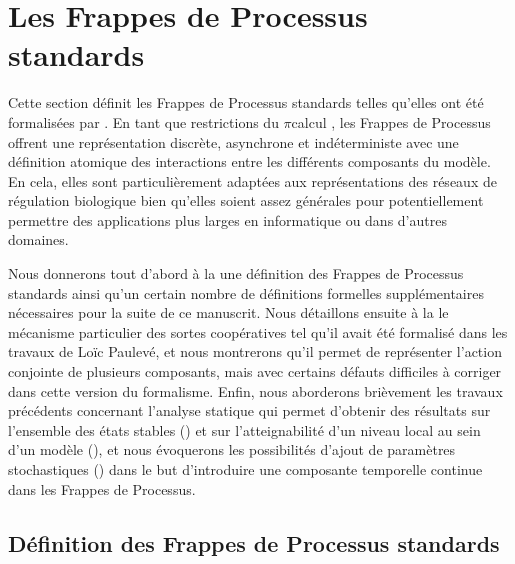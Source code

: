 \section{Les Frappes de Processus standards}

Cette section définit les Frappes de Processus standards
telles qu'elles ont été formalisées par .
En tant que restrictions du $\pi$\nbd calcul \cite{Brand83,Milner89},
les Frappes de Processus offrent une représentation discrète, asynchrone et indéterministe
avec une définition atomique des interactions entre les différents composants du modèle.
En cela,
elles sont particulièrement adaptées aux représentations des réseaux de régulation biologique
bien qu'elles soient assez générales pour potentiellement permettre des applications plus
larges en informatique ou dans d'autres domaines.

Nous donnerons tout d'abord à la  une définition des Frappes de Processus standards
ainsi qu'un certain nombre de définitions formelles supplémentaires
nécessaires pour la suite de ce manuscrit.
Nous détaillons ensuite à la  le mécanisme particulier des sortes coopératives
tel qu'il avait été formalisé dans les travaux de Loïc Paulevé,
et nous montrerons qu'il permet de représenter l'action conjointe de plusieurs composants,
mais avec certains défauts difficiles à corriger dans cette version du formalisme.
Enfin, nous aborderons brièvement les travaux précédents
concernant l'analyse statique qui permet d'obtenir des résultats
sur l'ensemble des états stables ()
et sur l'atteignabilité d'un niveau local au sein d'un modèle (),
et nous évoquerons les possibilités d'ajout de paramètres stochastiques ()
dans le but d'introduire une composante temporelle continue dans les Frappes de Processus.



\subsection{Définition des Frappes de Processus standards}

